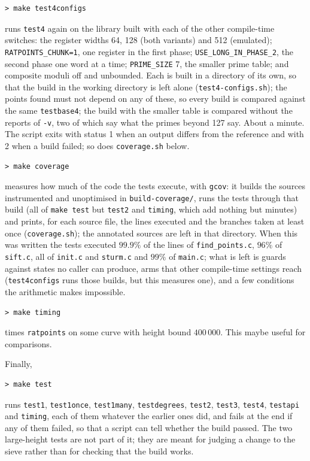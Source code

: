\documentclass[12pt,a4paper,oneside]{amsart}
\begin{document}
\begin{verbatim}
> make test4configs
\end{verbatim}
runs \texttt{test4} again on the library built with each of the other
compile-time switches: the register widths 64, 128 (both variants) and
512 (emulated); \texttt{RATPOINTS\_CHUNK=1}, one register in the first
phase; \texttt{USE\_LONG\_IN\_PHASE\_2}, the second phase one word at a
time; \texttt{PRIME\_SIZE} 7, the smaller prime table; and composite
moduli off and unbounded.  Each is
built in a directory of its own, so that the build in the working
directory is left alone (\texttt{test4-configs.sh}); the points found
must not depend on any of these, so every build is compared against the
same \texttt{testbase4}; the build with the smaller table is compared
without the reports of \verb+-v+, two of which say what the primes beyond
127 say.  About a minute.  The script exits with status 1 when an output
differs from the reference and with 2 when a build failed; so does
\texttt{coverage.sh} below.

\begin{verbatim}
> make coverage
\end{verbatim}
measures how much of the code the tests execute, with \texttt{gcov}: it
builds the sources instrumented and unoptimised in
\texttt{build-coverage/}, runs the tests through that build (all of
\texttt{make test} but \texttt{test2} and \texttt{timing}, which add
nothing but minutes) and prints, for each source file, the lines executed
and the branches taken at least once (\texttt{coverage.sh}); the
annotated sources are left in that directory.
When this was written the tests executed $99.9\%$ of the lines of
\texttt{find\_points.c}, $96\%$ of \texttt{sift.c}, all of \texttt{init.c}
and \texttt{sturm.c} and $99\%$ of \texttt{main.c}; what is left is guards
against states no caller can produce, arms that other compile-time settings
reach (\texttt{test4configs} runs those builds, but this measures one), and
a few conditions the arithmetic makes impossible.

\begin{verbatim}
> make timing
\end{verbatim}
times \texttt{ratpoints} on some curve with height bound $400\,000$.
This maybe useful for comparisons.

Finally,
\begin{verbatim}
> make test
\end{verbatim}
runs \texttt{test1}, \texttt{test1once}, \texttt{test1many},
\texttt{testdegrees}, \texttt{test2}, \texttt{test3}, \texttt{test4},
\texttt{testapi} and \texttt{timing}, each of them whatever the earlier
ones did, and fails at the end if any of them failed, so that a script can
tell whether the build passed.
The two large-height tests are not part of it; they are meant for judging a
change to the sieve rather than for checking that the build works.
\end{document}
